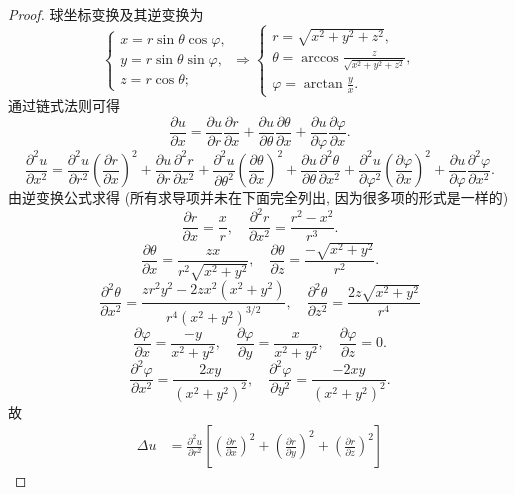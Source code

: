 \begin{proof}
  球坐标变换及其逆变换为
  \[\begin{cases}
    x = r\sin\theta\cos\varphi, \\
    y = r\sin\theta\sin\varphi, \\
    z = r\cos\theta;
  \end{cases}\Rightarrow
  \begin{cases}
    r = \sqrt{x^2+y^2+z^2}, \\
    \theta = \arccos\frac{z}{\sqrt{x^2+y^2+z^2}}, \\
    \varphi = \arctan\frac{y}{x}.
  \end{cases}\]
  通过链式法则可得
  \[\frac{\partial u}{\partial x}
    = \frac{\partial u}{\partial r}\frac{\partial r}{\partial x}
      + \frac{\partial u}{\partial\theta}\frac{\partial\theta}{\partial x}
      + \frac{\partial u}{\partial\varphi}\frac{\partial\varphi}{\partial x}.\]
  \[\frac{\partial^2u}{\partial x^2}
    = \frac{\partial^2u}{\partial r^2}\left(\frac{\partial r}{\partial x}\right)^2
      + \frac{\partial u}{\partial r}\frac{\partial^2r}{\partial x^2}
      + \frac{\partial^2u}{\partial\theta^2}\left(\frac{\partial\theta}{\partial x}\right)^2
      + \frac{\partial u}{\partial\theta}\frac{\partial^2\theta}{\partial x^2}
      + \frac{\partial^2u}{\partial\varphi^2}\left(\frac{\partial\varphi}{\partial x}\right)^2
      + \frac{\partial u}{\partial\varphi}\frac{\partial^2\varphi}{\partial x^2}.\]
  由逆变换公式求得 (所有求导项并未在下面完全列出, 因为很多项的形式是一样的)
  \[\frac{\partial r}{\partial x}
    = \frac{x}{r},\quad
    \frac{\partial^2r}{\partial x^2} = \frac{r^2-x^2}{r^3}.\]
  \[\frac{\partial\theta}{\partial x}
    = \frac{zx}{r^2\sqrt{x^2+y^2}},\quad
    \frac{\partial\theta}{\partial z}
    = \frac{-\sqrt{x^2+y^2}}{r^2}.\]
  \[\frac{\partial^2\theta}{\partial x^2}
    = \frac{zr^2y^2-2zx^2(x^2+y^2)}{r^4(x^2+y^2)^{3/2}},\quad
    \frac{\partial^2\theta}{\partial z^2}=\frac{2z\sqrt{x^2+y^2}}{r^4}\]
  \[\frac{\partial\varphi}{\partial x} = \frac{-y}{x^2+y^2},\quad
    \frac{\partial\varphi}{\partial y} = \frac{x}{x^2+y^2},\quad
    \frac{\partial\varphi}{\partial z}=0.\]
  \[\frac{\partial^2\varphi}{\partial x^2} = \frac{2xy}{(x^2+y^2)^2},\quad
    \frac{\partial^2\varphi}{\partial y^2}=\frac{-2xy}{(x^2+y^2)^2}.\]
  故
  \[\begin{split}
  \Delta u
    & = \frac{\partial^2u}{\partial r^2}\left[\left(\frac{\partial r}{\partial x}\right)^2
        + \left(\frac{\partial r}{\partial y}\right)^2
        + \left(\frac{\partial r}{\partial z}\right)^2\right]

\end{split}\]
\end{proof}
